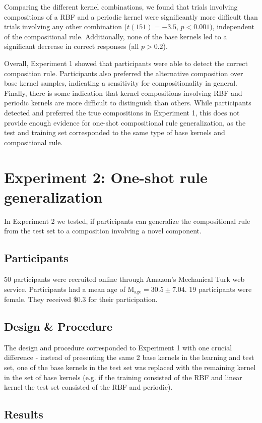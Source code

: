 \documentclass[10pt,letterpaper]{article}
\begin{document}
Comparing the different kernel combinations, we found that trials involving compositions of a RBF and a periodic kernel were significantly more difficult than trials involving any other combination ($t(151)=-3.5$, $p<0.001$), independent of the compositional rule. Additionally, none of the base kernels led to a significant decrease in correct responses (all $p>0.2$).

Overall, Experiment 1 showed that participants were able to detect the correct composition rule. Participants also preferred the alternative composition over base kernel samples, indicating a sensitivity for compositionality in general. Finally, there is some indication that kernel compositions involving RBF and periodic kernels are more difficult to distinguish than others. 
While participants detected and preferred the true compositions in Experiment 1, this does not provide enough evidence for one-shot compositional rule generalization, as the test and training set corresponded to the same type of base kernels and compositional rule.

\section{Experiment 2: One-shot rule generalization}
In Experiment 2 we tested, if participants can generalize the compositional rule from the test set to a composition involving a novel component.

\subsection{Participants}
50 participants were recruited online through Amazon's Mechanical Turk web service. Participants had a mean age of M$_\text{age}=30.5\pm 7.04$. 19 participants were female. They received \$0.3 for their participation. 

\subsection{Design \& Procedure}
The design and procedure corresponded to Experiment 1 with one crucial difference - instead of presenting the same 2 base kernels in the learning and test set, one of the base kernels in the test set was replaced with the remaining kernel in the set of base kernels (e.g. if the training consisted of the RBF and linear kernel the test set consisted of the RBF and periodic).

\subsection{Results}
\end{document}
